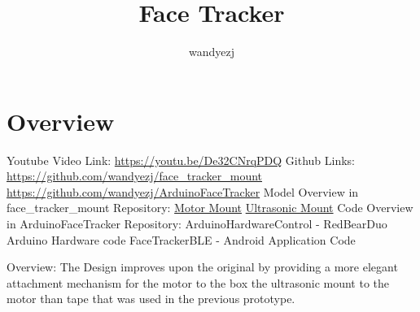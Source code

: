 \documentclass{article}
\title{Face Tracker}
\author{wandyezj}
\begin{document}
	\maketitle
	\tableofcontents
	
	
	
	\clearpage
	
	\section{Overview}
	
	Youtube Video Link: \href{https://youtu.be/De32CNrqPDQ}{https://youtu.be/De32CNrqPDQ}\newline
	Github Links: \newline
	\href{https://github.com/wandyezj/face_tracker_mount}{https://github.com/wandyezj/face\_tracker\_mount}\newline
	\href{https://github.com/wandyezj/ArduinoFaceTracker}{https://github.com/wandyezj/ArduinoFaceTracker}\newline
	\newline
	Model Overview in face\_tracker\_mount Repository:
	\newline
	\href{https://github.com/wandyezj/face\_tracker\_mount/blob/master/cad/motor\_mount.stl}{Motor Mount}\newline
	\href{https://github.com/wandyezj/face\_tracker\_mount/blob/master/cad/ultrasonic\_mount.stl}{Ultrasonic Mount}\newline
	\newline	
	Code Overview in ArduinoFaceTracker Repository:
	\newline
	ArduinoHardwareControl - RedBearDuo Arduino Hardware code
	\newline
	FaceTrackerBLE - Android Application Code
	\newline
	\newline
	
	

	Overview:
	The Design improves upon the original by providing a more elegant attachment mechanism for the motor to the box the ultrasonic mount to the motor than tape that was used in the previous prototype.
\end{document}
